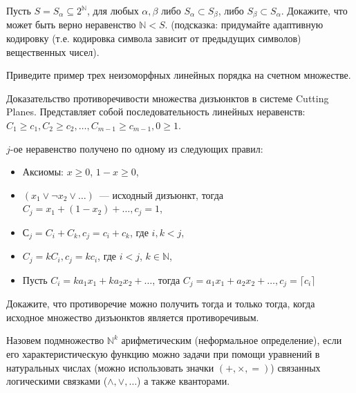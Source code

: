 \setcounter{curtask}{15}



\begin{task}
    Пусть $S = {S_{\alpha} \subseteq 2^{\mathbb{N}}}$, для любых $\alpha, \beta$ либо
    $S_{\alpha} \subset S_{\beta}$, либо $S_{\beta} \subset S_{\alpha}$. Докажите,
    что может быть верно неравенство $\mathbb{N} < S$. (подсказка: придумайте
    адаптивную кодировку (т.е. кодировка символа зависит от предыдущих символов)
    вещественных чисел). 
\end{task}

\begin{task}
    Приведите пример трех неизоморфных линейных порядка на счетном множестве.
\end{task}

\begin{task}
	Доказательство противоречивости множества дизъюнктов в системе Cutting
    Planes. Представляет собой последовательность линейных неравенств:
    $C_1 \ge c_1, C_2 \ge c_2, \dots, C_{m - 1} \ge c_{m - 1}, 0 \ge 1$.

    $j$-ое неравенство получено по одному из следующих правил:
    \begin{itemize}
        \item Аксиомы: $x \ge 0$, $1 - x \ge 0$,
	    \item $(x_1 \lor \neg x_2 \lor \dots)$~--- исходный дизъюнкт, тогда
    		$C_j = x_1 + (1 - x_2) + \dots, c_j = 1$,
        \item $С_j = C_i + C_k, c_j = c_i + c_k$, где $i, k < j$,
		\item $C_j = k C_i, c_j = k c_i$, где $i < j$, $k \in \mathbb{N}$,
        \item Пусть $C_i = k a_1 x_1 + k a_2 x_2 + \dots$, тогда $C_j = a_1 x_1 +
    		a_2 x_2 + \dots, c_j =  \lceil c_i \rceil$
        
    \end{itemize}

    Докажите, что противоречие можно получить тогда и только тогда, когда исходное
    множество дизъюнктов является противоречивым.
\end{task}


Назовем подмножество $\mathbb{N}^k$ арифметическим (неформальное определение),
если его характеристическую функцию можно задачи при помощи уравнений в натуральных
числах (можно использовать значки $(+, \times, =)$) связанных логическими связками ($\land,
\lor, \dots$) а также кванторами.

